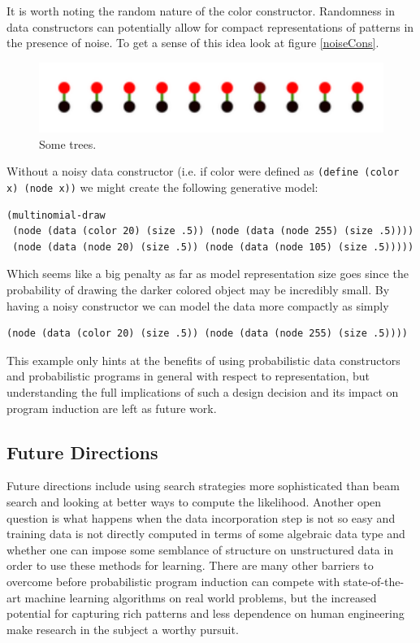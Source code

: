 \documentclass[a4paper,10pt]{article}
\begin{document}
It is worth noting the random nature of the color constructor.  Randomness in data constructors can potentially allow for compact representations of patterns in the presence of noise.  To get a sense of this idea look at figure \ref{noiseCons}. 
\begin{figure}[h]
\begin{center}
\includegraphics[scale=.60]{noisyConstructor.pdf}
\end{center}
\label{fig:noiseCons}
\caption{Some trees.}
\end{figure}
Without a noisy data constructor (i.e. if color were defined as \texttt{(define (color x) (node x))} we might create the following generative model:
\begin{lstlisting}
(multinomial-draw
 (node (data (color 20) (size .5)) (node (data (node 255) (size .5))))
 (node (data (node 20) (size .5)) (node (data (node 105) (size .5)))))
\end{lstlisting}
Which seems like a big penalty as far as model representation size goes since the probability of drawing the darker colored object may be incredibly small.  By having a noisy constructor we can model the data more compactly as simply 
\begin{lstlisting}
(node (data (color 20) (size .5)) (node (data (node 255) (size .5))))
\end{lstlisting}
This example only hints at the benefits of using probabilistic data constructors and probabilistic programs in general with respect to representation, but understanding the full implications of such a design decision and its impact on program induction are left as future work.

\subsection{Future Directions}

Future directions include using search strategies more sophisticated than beam search and looking at better ways to compute the likelihood.  Another open question is what happens when the data incorporation step is not so easy and training data is not directly computed in terms of some algebraic data type and whether one can impose some semblance of structure on unstructured data in order to use these methods for learning.  There are many other barriers to overcome before probabilistic program induction can compete with state-of-the-art machine learning algorithms on real world problems, but the increased potential for capturing rich patterns and less dependence on human engineering make research in the subject a worthy pursuit.


\end{document}
